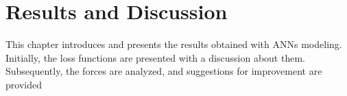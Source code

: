 \chapter{Results and Discussion}\label{sec:results}

This chapter introduces and presents the results obtained with ANNs modeling. Initially, the loss functions are presented with a discussion about them.
Subsequently, the forces are analyzed, and suggestions for improvement are provided